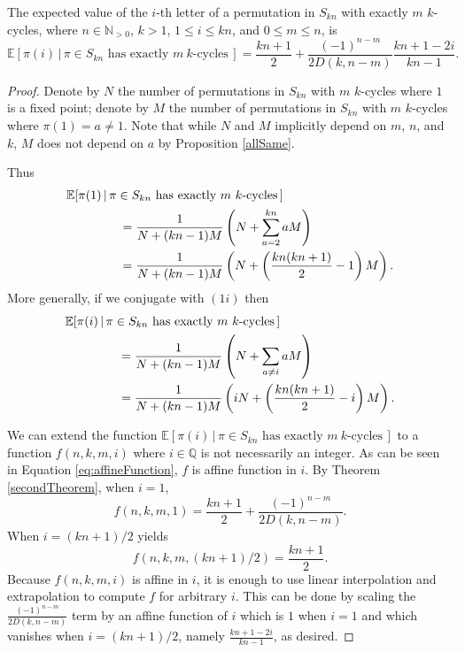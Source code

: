 \begin{corollary}
  The expected value of the $i$-th letter of a permutation in $S_{kn}$ with
  exactly $m$ $k$-cycles, where
  $n \in \mathbb N_{>0}$,
  $k > 1$,
  $1 \leq i \leq kn$, and
  $0 \leq m \leq n$, is
  \[\mathbb{E}[\pi(i)\, |\, \pi \in S_{kn} \text{ has exactly } m\ k \text{-cycles}\,]
  = \frac{kn+1}{2}+\frac{(-1)^{n-m}}{2D(k,n-m)}\frac{kn+1-2i}{kn-1}.\]
\end{corollary}
\begin{proof}
  Denote by $N$ the number of permutations in $S_{kn}$
  with $m$ $k$-cycles where $1$ is a fixed point;
  denote by $M$ the number of permutations in $S_{kn}$
  with $m$ $k$-cycles where $\pi(1) = a \neq 1$.
  Note that while $N$ and $M$ implicitly depend on $m$, $n$, and $k$,
  $M$ does not depend on $a$ by Proposition \ref{allSame}.

  Thus \begin{align}
    \notag
    &\mathbb{E}[\pi(1)\, |\, \pi \in S_{kn} \text{ has exactly } m\ k \text{-cycles}\,] \\
    \notag
    &\hspace{1.5cm}
    = \frac{1}{N + (kn-1)M}\left(N + \sum_{a = 2}^{kn} aM \right) \\
    &\hspace{1.5cm}
    = \frac{1}{N + (kn-1)M}\left( N + \left(\frac{kn(kn+1)}{2} - 1\right)M \right).
  \end{align}
%
  More generally, if we conjugate with $(1i)$ then
  \begin{align}
    \notag
    &\mathbb{E}[\pi(i)\, |\, \pi \in S_{kn} \text{ has exactly } m\ k \text{-cycles}\,] \\
    \notag
    &\hspace{1.5cm} = \frac{1}{N + (kn-1)M}\left( N + \sum_{a \neq i} aM \right) \\
    \label{eq:affineFunction}
    &\hspace{1.5cm} = \frac{1}{N + (kn-1)M}\left(iN + \left(\frac{kn(kn+1)}{2} - i\right)M \right).
  \end{align}

  We can extend the function
  $\mathbb{E}[\pi(i)\, |\, \pi \in S_{kn} \text{ has exactly } m\ k \text{-cycles}\,]$
  to a function $f(n,k,m,i)$ where $i \in \mathbb Q$ is not necessarily an integer.
  As can be seen in Equation \ref{eq:affineFunction}, $f$ is affine function in $i$.
  By Theorem \ref{secondTheorem}, when $i = 1$, \[
    f(n,k,m,1) =
    \frac{kn + 1}{2} + \frac{(-1)^{n-m}}{2 D(k, n - m)}.
  \]
  When $i = (kn+1)/2$ yields \[
    f(n,k,m,(kn+1)/2) = \frac{kn+1}{2}.
  \]
  Because $f(n,k,m,i)$ is affine in $i$, it is enough to use linear
  interpolation and extrapolation to compute $f$ for arbitrary $i$.
  This can be done by scaling the
  $\displaystyle \frac{(-1)^{n-m}}{2 D(k, n - m)}$ term
  by an affine function of $i$ which is $1$ when $i=1$ and which vanishes
  when $i = (kn+1)/2$, namely $\displaystyle \frac{kn + 1 - 2i}{kn - 1}$, as
  desired.
\end{proof}

